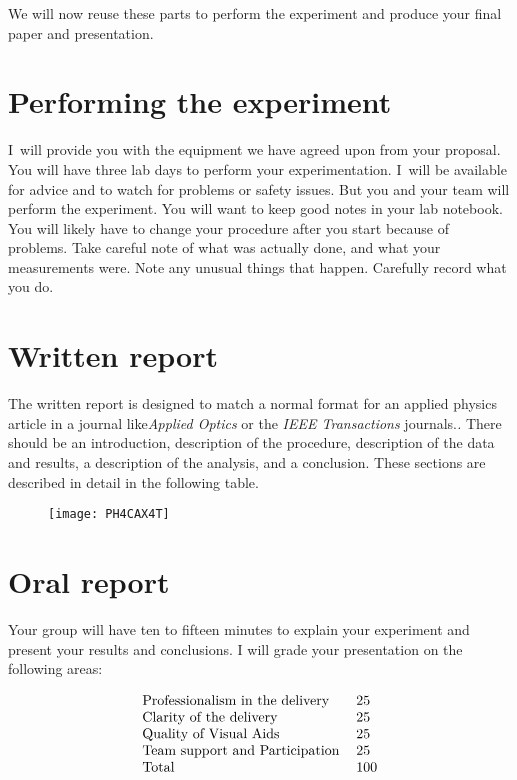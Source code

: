 We will now reuse these parts to perform the experiment and produce your
final paper and presentation.

\section{Performing the experiment}

I\ will provide you with the equipment we have agreed upon from your
proposal. You will have three lab days to perform your experimentation. I\
will be available for advice and to watch for problems or safety issues. But
you and your team will perform the experiment. You will want to keep good
notes in your lab notebook. You will likely have to change your procedure
after you start because of problems. Take careful note of what was actually
done, and what your measurements were. Note any unusual things that happen.
Carefully record what you do.

\section{Written report}

The written report is designed to match a normal format for an applied
physics article in a journal like\emph{Applied Optics} or the \emph{IEEE
Transactions} journals.\emph{.} There should be an introduction, description
of the procedure, description of the data and results, a description of the
analysis, and a conclusion. These sections are described in detail in the
following table.

\begin{figure}[h!]
\texttt{[image: PH4CAX4T]}
\end{figure}

\section{Oral report}

Your group will have ten to fifteen minutes to explain your experiment and
present your results and conclusions. I will grade your presentation on the
following areas:

\begin{equation*}
\begin{tabular}{ll}
Professionalism in the delivery & 25 \\ 
Clarity of the delivery & 25 \\ 
Quality of Visual Aids & 25 \\ 
Team support and Participation & 25 \\ 
Total & 100%
\end{tabular}%
\end{equation*}

